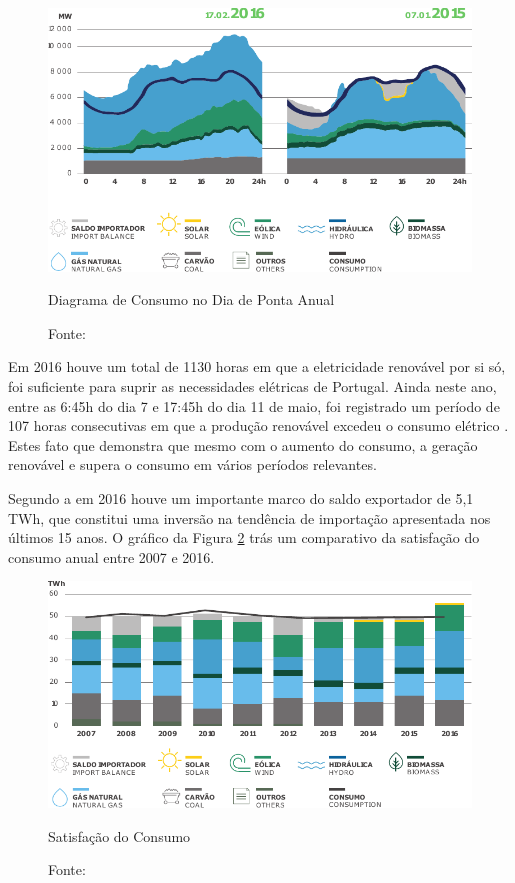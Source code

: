 \begin{figure}[H]
	\centering
	\captionsetup{width=0.7\textwidth, font=footnotesize, textfont=bf}	
	\includegraphics[width=0.7\linewidth]{img/ConsumoDiaDePontaAnual.pdf}
	\caption{Diagrama de Consumo no Dia de Ponta Anual}
	\vspace{-3.5mm}
	\caption*{Fonte: }
	\label{fig:ConsumoDiaDePontaAnual}
\end{figure}

Em 2016 houve um total de  1130 horas em que a eletricidade renovável por si só, foi suficiente para suprir as necessidades elétricas de Portugal. Ainda neste ano, entre as 6:45h do dia 7 e 17:45h do dia 11 de maio, foi registrado um período de 107 horas consecutivas em que a produção renovável excedeu o consumo elétrico \cite{apren}. Estes fato que demonstra que mesmo com o aumento do consumo, a geração renovável e supera o consumo em vários períodos relevantes. 

Segundo a  em 2016 houve um importante marco do saldo exportador de 5,1 TWh, que constitui uma inversão na tendência de importação apresentada nos últimos 15 anos. O gráfico da Figura \ref{fig:SatisfacaoDoConsumo} trás um comparativo da satisfação do consumo anual entre 2007 e 2016. 

\vspace{5.5mm}

\begin{figure}[H]
	\centering
	\captionsetup{width=0.7\textwidth, font=footnotesize, textfont=bf}	
	\includegraphics[width=0.7\linewidth]{img/SatisfacaoDoConsumo.pdf}
	\caption{Satisfação do Consumo}
	\vspace{-3.5mm}
	\caption*{Fonte: }
	\label{fig:SatisfacaoDoConsumo}
\end{figure}




